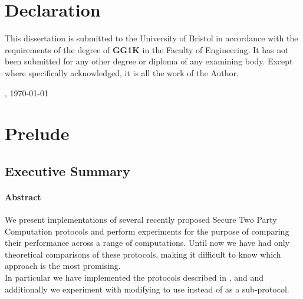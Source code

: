 \documentclass[ %
                    author={Nicholas Tutte},
                supervisor={Prof. Nigel Smart},
                    degree={MEng},
                     title={Secure Two Party Computation},
                  subtitle={A practical comparison of recent protocols},
                      type={Research - GG1K},
                      year={2015} ]{dissertation}
\begin{document}
	\maketitle
	
	\chapter*{Declaration}

		This dissertation is submitted to the University of Bristol in accordance 
		with the requirements of the degree of \textbf{GG1K} in the Faculty 
		of Engineering.  It has not been submitted for any other degree or diploma 
		of any examining body.  Except where specifically acknowledged, it is all 
		the work of the Author. 

		\vspace{6cm}

		, \today


	\chapter*{Prelude}
		\section*{Executive Summary}
			\subsubsection*{Abstract}
			  We present implementations of several recently proposed Secure Two Party Computation protocols and perform experiments for the purpose of comparing their performance across a range of computations. Until now we have had only theoretical comparisons of these protocols, making it difficult to know which approach is the most promising.\\

			  In particular we have implemented the protocols described in \cite{LindellAndPinkas2011}, \cite{Lindell_CnC_2013} and \cite{Katz_Symm_CnC_2013} and additionally we experiment with modifying \cite{Lindell_CnC_2013} to use \cite{Katz_Symm_CnC_2013} instead of \cite{LindellAndPinkas2011} as a sub-protocol.\\
\end{document}
